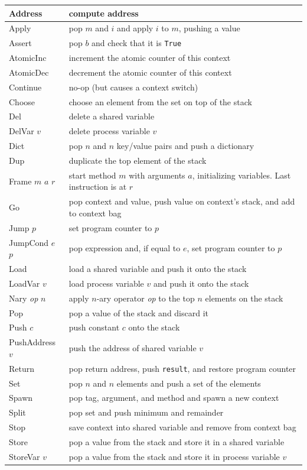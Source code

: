 \documentclass{report}
\begin{document}
\vspace{1em}
\begin{tabular}{|l|l|}
\hline
Address & compute address \\
\hline
Apply & pop $m$ and $i$ and apply $i$ to $m$, pushing a value \\
\hline
Assert & pop $b$ and check that it is \texttt{True} \\
\hline
AtomicInc & increment the atomic counter of this context \\
\hline
AtomicDec & decrement the atomic counter of this context \\
\hline
Continue & no-op (but causes a context switch) \\
\hline
Choose & choose an element from the set on top of the stack \\
\hline
Del & delete a shared variable \\
\hline
DelVar $v$ & delete process variable $v$ \\
\hline
Dict & pop $n$ and $n$ key/value pairs and push a dictionary \\
\hline
Dup & duplicate the top element of the stack \\
\hline
Frame $m$ $a$ $r$& start method $m$ with arguments $a$,
initializing variables.  Last instruction is at $r$ \\
\hline
Go & pop context and value, push value on context's stack, and add to context bag \\
\hline
Jump $p$ & set program counter to $p$ \\
\hline
JumpCond $e$ $p$ & pop expression and, if equal to $e$, set program counter to $p$ \\
\hline
Load & load a shared variable and push it onto the stack \\
\hline
LoadVar $v$ & load process variable $v$ and push it onto the stack \\
\hline
Nary \textit{op} $n$ & apply $n$-ary operator \textit{op} to the top $n$ elements on the stack \\
\hline
Pop & pop a value of the stack and discard it \\
\hline
Push $c$ & push constant $c$ onto the stack \\
\hline
PushAddress $v$ & push the address of shared variable $v$ \\
\hline
Return & pop return address, push \texttt{result}, and restore program counter \\
\hline
Set & pop $n$ and $n$ elements and push a set of the elements \\
\hline
Spawn & pop tag, argument, and method and spawn a new context \\
\hline
Split & pop set and push minimum and remainder \\
\hline
Stop & save context into shared variable and remove from context bag \\
\hline
Store & pop a value from the stack and store it in a shared variable \\
\hline
StoreVar $v$ & pop a value from the stack and store it in process variable $v$ \\
\hline
\end{tabular}
\vspace{1em}
\end{document}
